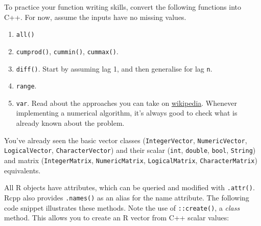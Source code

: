 To practice your function writing skills, convert the following
functions into C++. For now, assume the inputs have no missing values.

\begin{enumerate}
\def\labelenumi{\arabic{enumi}.}
\item
  \texttt{all()}
\item
  \texttt{cumprod()}, \texttt{cummin()}, \texttt{cummax()}.
\item
  \texttt{diff()}. Start by assuming lag 1, and then generalise for lag
  \texttt{n}.
\item
  \texttt{range}.
\item
  \texttt{var}. Read about the approaches you can take on
  \href{http://en.wikipedia.org/wiki/Algorithms_for_calculating_variance}{wikipedia}.
  Whenever implementing a numerical algorithm, it's always good to check
  what is already known about the problem.
\end{enumerate}


You've already seen the basic vector classes (\texttt{IntegerVector},
\texttt{NumericVector}, \texttt{LogicalVector},
\texttt{CharacterVector}) and their scalar (\texttt{int},
\texttt{double}, \texttt{bool}, \texttt{String}) and matrix
(\texttt{IntegerMatrix}, \texttt{NumericMatrix}, \texttt{LogicalMatrix},
\texttt{CharacterMatrix}) equivalents.

All R objects have attributes, which can be queried and modified with
\texttt{.attr()}. Rcpp also provides \texttt{.names()} as an alias for
the name attribute. The following code snippet illustrates these
methods. Note the use of \texttt{::create()}, a \emph{class} method.
This allows you to create an R vector from C++ scalar values:
 

\begin{Shaded}
\begin{Highlighting}[]
  

  \NormalTok{, }\NormalTok{, }\NormalTok{);}

  \NormalTok{, }\NormalTok{, }\NormalTok{);}
  \NormalTok{) = }\NormalTok{;}
  \NormalTok{) = }\NormalTok{;}

   
\NormalTok{\}}
\end{Highlighting}
\end{Shaded}

